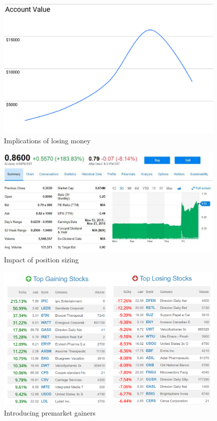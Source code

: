 \documentclass{article}
\begin{document}
\vspace{10pt}

\begin{figure}[!htb]
    \centering
    \includegraphics[width=\textwidth]{imgs/111.png}
    \caption{Implications of losing money}
\end{figure}

\vspace{10pt}

\begin{figure}[!htb]
    \centering
    \includegraphics[width=\textwidth]{imgs/112.png}
    \caption{Impact of position sizing}
\end{figure}

\vspace{10pt}

\begin{figure}[!htb]
    \centering
    \includegraphics[width=\textwidth]{imgs/113.png}
    \caption{Introducing premarket gainers}
\end{figure}
\end{document}

